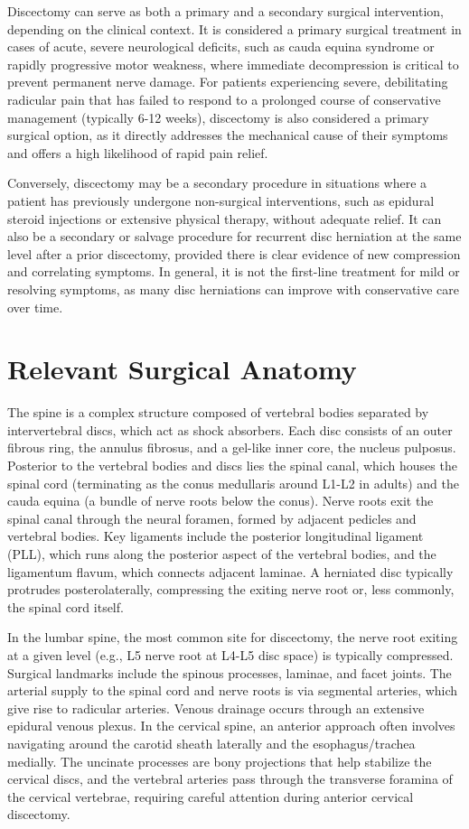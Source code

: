 Discectomy can serve as both a primary and a secondary surgical intervention, depending on the clinical context. It is considered a primary surgical treatment in cases of acute, severe neurological deficits, such as cauda equina syndrome or rapidly progressive motor weakness, where immediate decompression is critical to prevent permanent nerve damage. For patients experiencing severe, debilitating radicular pain that has failed to respond to a prolonged course of conservative management (typically 6-12 weeks), discectomy is also considered a primary surgical option, as it directly addresses the mechanical cause of their symptoms and offers a high likelihood of rapid pain relief.

Conversely, discectomy may be a secondary procedure in situations where a patient has previously undergone non-surgical interventions, such as epidural steroid injections or extensive physical therapy, without adequate relief. It can also be a secondary or salvage procedure for recurrent disc herniation at the same level after a prior discectomy, provided there is clear evidence of new compression and correlating symptoms. In general, it is not the first-line treatment for mild or resolving symptoms, as many disc herniations can improve with conservative care over time.

\section*{Relevant Surgical Anatomy}
The spine is a complex structure composed of vertebral bodies separated by intervertebral discs, which act as shock absorbers. Each disc consists of an outer fibrous ring, the annulus fibrosus, and a gel-like inner core, the nucleus pulposus. Posterior to the vertebral bodies and discs lies the spinal canal, which houses the spinal cord (terminating as the conus medullaris around L1-L2 in adults) and the cauda equina (a bundle of nerve roots below the conus). Nerve roots exit the spinal canal through the neural foramen, formed by adjacent pedicles and vertebral bodies. Key ligaments include the posterior longitudinal ligament (PLL), which runs along the posterior aspect of the vertebral bodies, and the ligamentum flavum, which connects adjacent laminae. A herniated disc typically protrudes posterolaterally, compressing the exiting nerve root or, less commonly, the spinal cord itself.

In the lumbar spine, the most common site for discectomy, the nerve root exiting at a given level (e.g., L5 nerve root at L4-L5 disc space) is typically compressed. Surgical landmarks include the spinous processes, laminae, and facet joints. The arterial supply to the spinal cord and nerve roots is via segmental arteries, which give rise to radicular arteries. Venous drainage occurs through an extensive epidural venous plexus. In the cervical spine, an anterior approach often involves navigating around the carotid sheath laterally and the esophagus/trachea medially. The uncinate processes are bony projections that help stabilize the cervical discs, and the vertebral arteries pass through the transverse foramina of the cervical vertebrae, requiring careful attention during anterior cervical discectomy.

